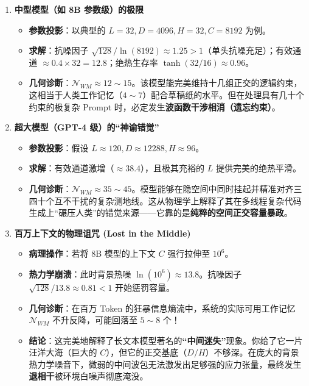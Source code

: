 \begin{enumerate}
    \item \textbf{\textcolor{structurecolor}{中型模型（如 8B 参数级）的极限}}
    \begin{itemize}
        \item \textbf{参数投影}：以典型的 $L=32, D=4096, H=32, C=8192$ 为例。
        \item \textbf{求解}：抗噪因子 $\sqrt{128}/\ln(8192) \approx 1.25 > 1$（单头抗噪充足）；有效通道 $\approx 0.4 \times 32 = 12.8$；绝热生存率 $\tanh(32/16) \approx 0.96$。
        \item \textbf{几何诊断}：$\mathcal{N}_{WM} \approx 12 \sim 15$。该模型能完美维持十几组正交的逻辑约束，这相当于人类工作记忆（$4 \sim 7$）配合草稿纸的水平。但在处理具有几十个约束的极复杂 Prompt 时，必定发生\textbf{波函数干涉相消（遗忘约束）}。
    \end{itemize}

    \item \textbf{\textcolor{structurecolor}{超大模型（GPT-4 级）的“神谕错觉”}}
    \begin{itemize}
        \item \textbf{参数投影}：假设 $L \approx 120, D \approx 12288, H \approx 96$。
        \item \textbf{求解}：有效通道激增（$\approx 38.4$），且极其充裕的 $L$ 提供完美的绝热平滑。
        \item \textbf{几何诊断}：$\mathcal{N}_{WM} \approx 35 \sim 45$。模型能够在隐空间中同时挂起并精准对齐三四十个互不干扰的复杂测地线。这从物理学上解释了其在多线程复杂代码生成上“碾压人类”的错觉来源——它靠的是\textbf{纯粹的空间正交容量暴政}。
    \end{itemize}

    \item \textbf{\textcolor{structurecolor}{百万上下文的物理诅咒 (Lost in the Middle)}}
    \begin{itemize}
        \item \textbf{病理操作}：若将 8B 模型的上下文 $C$ 强行拉伸至 $10^6$。
        \item \textbf{热力学崩溃}：此时背景热噪 $\ln(10^6) \approx 13.8$。抗噪因子 $\sqrt{128}/13.8 \approx 0.81 < 1$ 开始惩罚容量。
        \item \textbf{几何诊断}：在百万 Token 的狂暴信息熵流中，系统的实际可用工作记忆 $\mathcal{N}_{WM}$ 不升反降，可能回落至 $5 \sim 8$ 个！
        \item \textbf{结论}：这完美地解释了长文本模型著名的\textbf{“中间迷失”}现象。你给了它一片汪洋大海（巨大的 $C$），但它的正交基底（$D/H$）不够深。在庞大的背景热力学噪音下，微弱的中间波包无法激发出足够强的应力张量，最终发生\textbf{退相干}被环境白噪声彻底淹没。
    \end{itemize}
\end{enumerate}

